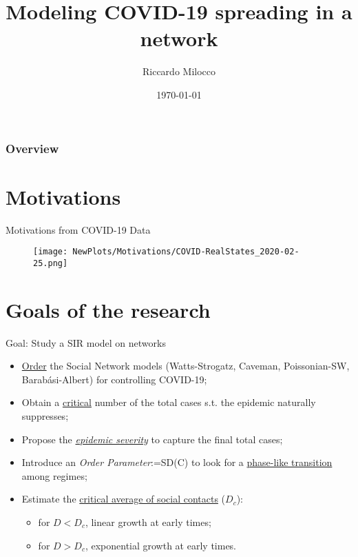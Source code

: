 \documentclass[xcolor={dvipsnames}]{beamer}
\title[Network Covid-19]{Modeling COVID-19 spreading in a network} %
\author{Riccardo Milocco} %
\institute[UniPD] %
{
University of Padova \\ %
\medskip
\textit{} %
}
\date{\today} %
\begin{document}
\begin{frame}
\titlepage %
\end{frame}

\begin{frame}
\frametitle{Overview} %
\tableofcontents %
\end{frame}

\section{Motivations}
\begin{frame}{Motivations from COVID-19 Data}
	\begin{figure}[h]
		\centering
		\texttt{[image: NewPlots/Motivations/COVID-RealStates\_2020-02-25.png]}
	\end{figure}
\end{frame}

\section{Goals of the research}
\begin{frame}{Goal: Study a SIR model on networks}
\centering
\begin{itemize}
	\item \underline{Order} the Social Network models (Watts-Strogatz, Caveman, Poissonian-SW, Barabási-Albert) for controlling COVID-19; \vfill
	\item Obtain a \underline{critical} number of the total cases s.t. the epidemic naturally suppresses; \vfill
	\item Propose the \underline{\textit{epidemic severity}} to capture the final total cases; \vfill
	\item Introduce an \textit{Order Parameter}:=SD(C) to look for a \underline{phase-like transition} among regimes; \vfill
	\item Estimate the \underline{critical average of social contacts} ($D_c$):
	\begin{itemize}
		\item for $D<D_c$, linear growth at early times;
		\vspace{2mm }
		\item for $D>D_c$, exponential growth at early times.
	\end{itemize}
\end{itemize}
\end{frame}
\end{document}
